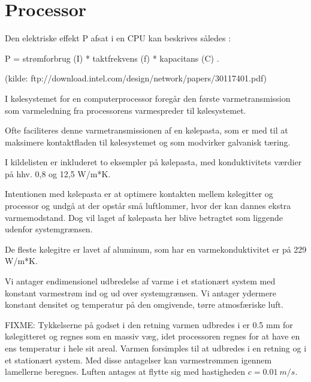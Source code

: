 \section{Processor}

Den elektriske effekt P afsat i en CPU kan beskrives således :

 P = strømforbrug (I) * taktfrekvens (f) * kapacitans (C) .

 (kilde: ftp://download.intel.com/design/network/papers/30117401.pdf)

I kølesystemet for en computerprocessor foregår den første varmetransmission som varmeledning fra processorens varmespreder til kølesystemet.

Ofte faciliteres denne varmetransmissionen af en kølepasta, som er med til at maksimere kontaktfladen til kølesystemet og som modvirker galvanisk tæring.

I kildelisten er inkluderet to eksempler på kølepasta, med konduktivitets værdier på hhv. 0,8 og 12,5 W/m*K.

Intentionen med kølepasta er at optimere kontakten mellem kølegitter og processor og undgå at der opstår små luftlommer, hvor der kan dannes ekstra varmemodstand. Dog vil laget af kølepasta her blive betragtet som liggende udenfor systemgrænsen.

De fleste kølegitre er lavet af aluminum, som har en varmekonduktivitet er på 229 W/m*K.

Vi antager endimensionel udbredelse af varme i et stationært system med konstant varmestrøm ind og ud over systemgrænsen. Vi antager ydermere konstant densitet og temperatur på den omgivende, tørre atmosfæriske luft.

FIXME:
Tykkelserne på godset i den retning varmen udbredes i er 0.5 mm for kølegitteret og regnes som en massiv væg, idet processoren regnes for at have en ens temperatur i hele sit areal.  Varmen forsimples til at udbredes i en retning og i et stationært system.  Med disse antagelser kan varmestrømmen igennem lamellerne beregnes.
Luften antages at flytte sig med hastigheden $c = 0.01\ m/s.$